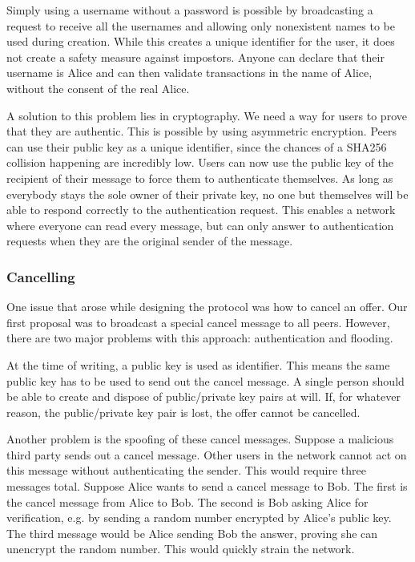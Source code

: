 Simply using a username without a password is possible by broadcasting a request to receive all the usernames and allowing only nonexistent names to be used during creation.
While this creates a unique identifier for the user, it does not create a safety measure against impostors.
Anyone can declare that their username is Alice and can then validate transactions in the name of Alice, without the consent of the real Alice.

A solution to this problem lies in cryptography.
We need a way for users to prove that they are authentic.
This is possible by using asymmetric encryption.
Peers can use their public key as a unique identifier, since the chances of a SHA256 collision happening are incredibly low.
Users can now use the public key of the recipient of their message to force them to authenticate themselves.
As long as everybody stays the sole owner of their private key, no one but themselves will be able to respond correctly to the authentication request.
This enables a network where everyone can read every message, but can only answer to authentication requests when they are the original sender of the message.

\subsubsection{Cancelling}
\label{sprint1:cancelling}
One issue that arose while designing the protocol was how to cancel an offer.
Our first proposal was to broadcast a special cancel message to all peers.
However, there are two major problems with this approach: authentication and flooding.

At the time of writing, a public key is used as identifier.
This means the same public key has to be used to send out the cancel message.
A single person should be able to create and dispose of public/private key pairs at will.
If, for whatever reason, the public/private key pair is lost, the offer cannot be cancelled.

Another problem is the spoofing of these cancel messages.
Suppose a malicious third party sends out a cancel message.
Other users in the network cannot act on this message without authenticating the sender.
This would require three messages total.
Suppose Alice wants to send a cancel message to Bob.
The first is the cancel message from Alice to Bob.
The second is Bob asking Alice for verification, e.g.
by sending a random number encrypted by Alice's public key.
The third message would be Alice sending Bob the answer, proving she can unencrypt the random number.
This would quickly strain the network.


